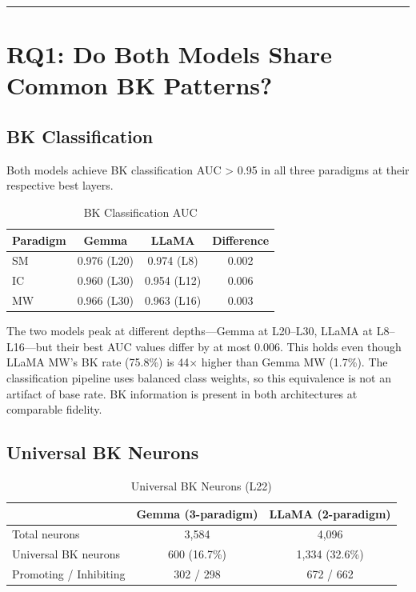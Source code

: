 \documentclass[11pt,a4paper]{article}
\begin{document}
\bigskip\hrule\bigskip

\section{RQ1: Do Both Models Share Common BK Patterns?}

\subsection{BK Classification}\label{sec:rq1_classification}

Both models achieve BK classification AUC > 0.95 in all three paradigms at their respective best layers.

\begin{table}[H]
\centering
\caption{BK Classification AUC}
\begin{tabular}{lccc}
\toprule
\textbf{Paradigm} & \textbf{Gemma} & \textbf{LLaMA} & \textbf{Difference} \\
\midrule
SM & 0.976 (L20) & 0.974 (L8) & 0.002 \\
IC & 0.960 (L30) & 0.954 (L12) & 0.006 \\
MW & 0.966 (L30) & 0.963 (L16) & 0.003 \\
\bottomrule
\end{tabular}
\end{table}

The two models peak at different depths---Gemma at L20--L30, LLaMA at L8--L16---but their best AUC values differ by at most 0.006. This holds even though LLaMA MW's BK rate (75.8\%) is 44$\times$ higher than Gemma MW (1.7\%). The classification pipeline uses balanced class weights, so this equivalence is not an artifact of base rate. BK information is present in both architectures at comparable fidelity.

\subsection{Universal BK Neurons}

\begin{table}[H]
\centering
\caption{Universal BK Neurons (L22)}
\begin{tabular}{lcc}
\toprule
 & \textbf{Gemma (3-paradigm)} & \textbf{LLaMA (2-paradigm)} \\
\midrule
Total neurons & 3{,}584 & 4{,}096 \\
Universal BK neurons & 600 (16.7\%) & 1{,}334 (32.6\%) \\
Promoting / Inhibiting & 302 / 298 & 672 / 662 \\
\bottomrule
\end{tabular}
\end{table}
\end{document}
